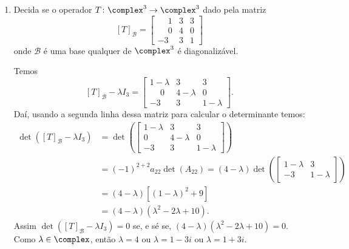 \begin{exemplo}
\begin{enumerate}[label={\arabic*})]
        \item Decida se o operador $T \colon \complex^3 \to \complex^3$ dado pela matriz
            \[
                [T]_\mathcal{B} = \begin{bmatrix}\phantom{-}1 & 3 & 3\\\phantom{-}0 & 4 & 0\\-3 & 3 & 1\end{bmatrix}
            \]
            onde $\mathcal{B}$ é uma base qualquer de $\complex^3$ é diagonalizável.
            \begin{solucao}
                Temos
                \[
                    [T]_\mathcal{B} - \lambda I_3 = \begin{bmatrix}1 - \lambda & 3 & 3\\\phantom{-}0 & 4 - \lambda & 0\\-3 & 3 & 1 - \lambda\end{bmatrix}.
                \]
                Daí, usando a segunda linha dessa matriz para calcular o determinante temos:
                \begin{align*}
                    \det([T]_\mathcal{B} - \lambda I_3) &= \det\left(\begin{bmatrix}1 - \lambda & 3 & 3\\0 & 4 - \lambda & 0\\-3 & 3 & 1 - \lambda\end{bmatrix}\right) \\ &= (-1)^{2 + 2}a_22\det(A_{22}) = (4 - \lambda)\det\left(\begin{bmatrix}1 - \lambda & 3\\-3 & 1 - \lambda\end{bmatrix}\right) \\ &= (4 - \lambda)[(1 - \lambda)^2 + 9] \\ &= (4 - \lambda)(\lambda^2 - 2\lambda + 10).
                \end{align*}
                Assim $\det([T]_\mathcal{B} - \lambda I_3) = 0$ se, e sé se, $(4 - \lambda)(\lambda^2 - 2\lambda + 10) = 0$. Como $\lambda \in \complex$, então $\lambda = 4$ ou $\lambda = 1 - 3i$ ou $\lambda = 1 + 3i$.


\end{solucao}
\end{enumerate}
\end{exemplo}
